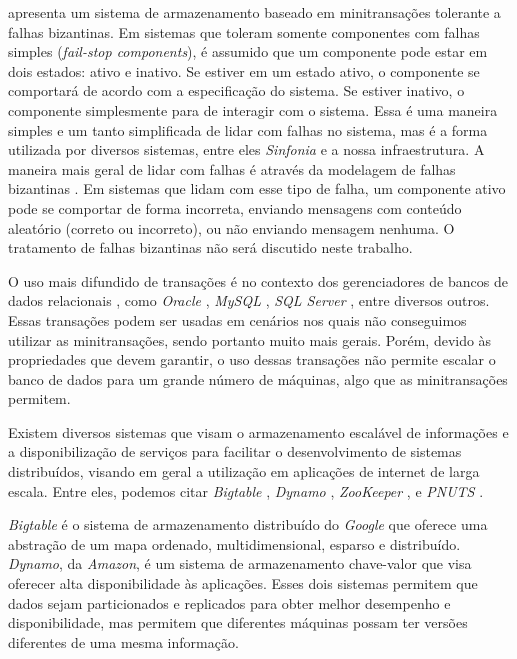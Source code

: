 \documentclass[11pt,twoside,a4paper]{book}
\begin{document}
\cite{padilha} apresenta um sistema de armazenamento baseado em minitransações tolerante a falhas bizantinas. Em sistemas que toleram somente componentes com falhas simples (\emph{fail-stop components}), é assumido que um componente pode estar em dois estados: ativo e inativo. Se estiver em um estado ativo, o componente se comportará de acordo com a especificação do sistema. Se estiver inativo, o componente simplesmente para de interagir com o sistema. Essa é uma maneira simples e um tanto simplificada de lidar com falhas no sistema, mas é a forma utilizada por diversos sistemas, entre eles \emph{Sinfonia} e a nossa infraestrutura. A maneira mais geral de lidar com falhas é através da modelagem de falhas bizantinas \cite{byzantine}. Em sistemas que lidam com esse tipo de falha, um componente ativo pode se comportar de forma incorreta, enviando mensagens com conteúdo aleatório (correto ou incorreto), ou não enviando mensagem nenhuma. O tratamento de falhas bizantinas não será discutido neste trabalho.

O uso mais difundido de transações é no contexto dos gerenciadores de bancos de dados relacionais \cite{vaca}, como \emph{Oracle} \cite{oracle}, \emph{MySQL} \cite{mysql}, \emph{SQL Server} \cite{sqlserver}, entre diversos outros. Essas transações podem ser usadas em cenários nos quais não conseguimos utilizar as minitransações, sendo portanto muito mais gerais. Porém, devido às propriedades que devem garantir, o uso dessas transações não permite escalar o banco de dados para um grande número de máquinas, algo que as minitransações permitem.

Existem diversos sistemas que visam o armazenamento escalável de informações e a disponibilização de serviços para facilitar o  desenvolvimento de sistemas distribuídos, visando em geral a utilização em aplicações de internet de larga escala. Entre eles, podemos citar \emph{Bigtable} \cite{bigtable}, \emph{Dynamo} \cite{dynamo}, \emph{ZooKeeper} \cite{zookeeper}, e \emph{PNUTS} \cite{pnuts}.

\emph{Bigtable} é o sistema de armazenamento distribuído do \emph{Google} que oferece uma abstração de um mapa ordenado, multidimensional, esparso e distribuído. \emph{Dynamo}, da \emph{Amazon}, é um sistema de armazenamento chave-valor que visa oferecer alta disponibilidade às aplicações. Esses dois sistemas permitem que dados sejam particionados e replicados para obter melhor desempenho e disponibilidade, mas
permitem que diferentes máquinas possam ter versões diferentes de uma mesma informação.
\end{document}
